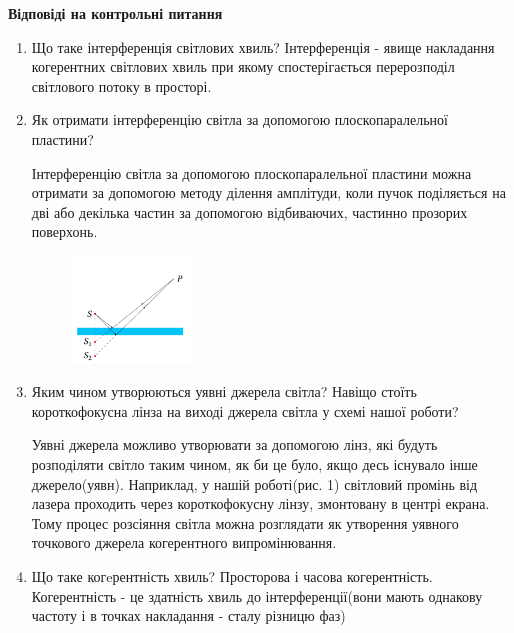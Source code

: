 \begin{center}
    \Large{\textbf{Відповіді на контрольні питання}}    
\end{center}

\vspace{1mm}

\begin{enumerate}
    \item Що таке інтерференція світлових хвиль?
    \bigbreak
    Інтерференція - явище накладання когерентних світлових хвиль при якому спостерігається перерозподіл світлового потоку в просторі.

    \item Як отримати інтерференцію світла за допомогою плоскопаралельної пластини?
    \bigbreak

    Інтерференцію світла за допомогою плоскопаралельної пластини
    можна отримати за допомогою методу ділення амплітуди, коли
    пучок поділяється на дві або декілька частин  за 
    допомогою відбиваючих, частинно прозорих поверхонь.

    \begin{figure}[h]
        \centering
        \includegraphics[width=0.3\textwidth]{assets/separate_amplitude.png}
    \end{figure}

    \item Яким чином утворюються уявні джерела світла? Навіщо стоїть 
    короткофокусна лінза на виході джерела світла у схемі нашої роботи?
    \bigbreak

    Уявні джерела можливо утворювати за допомогою лінз,
    які будуть розподіляти світло таким чином, як би це було,
    якщо десь існувало інше джерело(уявн). Наприклад,
    у нашій роботі(рис. 1) світловий промінь від лазера
    проходить через короткофокусну лінзу, змонтовану в центрі
    екрана. Тому процес розсіяння світла можна розглядати
    як утворення уявного точкового джерела когерентного
    випромінювання.

    \item Що таке когeрентність хвиль? Просторова і часова когерентність.
    \bigbreak
    Когерентність - це здатність хвиль до інтерференції(вони мають 
    однакову частоту і в точках накладання - сталу різницю фаз)


\end{enumerate}
